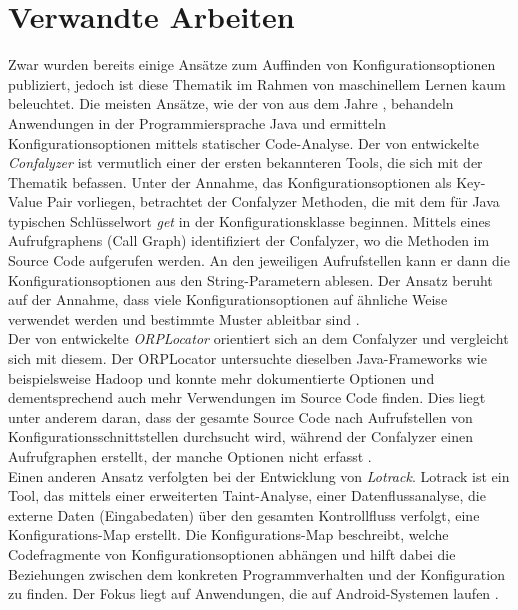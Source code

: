 \documentclass[german,bachelor]{swsLeipzig}
\begin{document}
\chapter{Verwandte Arbeiten}\label{Verwandte Arbeiten}
Zwar wurden bereits einige Ansätze zum Auffinden von Konfigurationsoptionen publiziert, jedoch ist diese Thematik im Rahmen von
maschinellem Lernen kaum beleuchtet.
Die meisten Ansätze, wie der von \citeauthor{10.1145/1985793.1985812} aus dem Jahre \citeyear{10.1145/1985793.1985812},
behandeln Anwendungen in der Programmiersprache Java und ermitteln Konfigurationsoptionen mittels statischer Code-Analyse.
Der von \citeauthor{10.1145/1985793.1985812} entwickelte \textit{Confalyzer} ist vermutlich einer der ersten bekannteren
Tools, die sich mit der Thematik befassen.
Unter der Annahme, das Konfigurationsoptionen als Key-Value Pair vorliegen, betrachtet der Confalyzer Methoden, die mit
dem für Java typischen Schlüsselwort \textit{get} in der Konfigurationsklasse beginnen.
Mittels eines Aufrufgraphens (Call Graph) identifiziert der Confalyzer, wo die Methoden im Source Code aufgerufen werden.
An den jeweiligen Aufrufstellen kann er dann die Konfigurationsoptionen aus den String-Parametern ablesen.
Der Ansatz beruht auf der Annahme, dass viele Konfigurationsoptionen auf ähnliche Weise verwendet werden und bestimmte
Muster ableitbar sind \cite[]{10.1145/1985793.1985812}.\\

Der von \citeauthor{7774519} entwickelte \textit{ORPLocator} orientiert sich an dem Confalyzer und vergleicht sich mit diesem.
Der ORPLocator untersuchte dieselben Java-Frameworks wie beispielsweise Hadoop und konnte mehr dokumentierte
Optionen und dementsprechend auch mehr Verwendungen im Source Code finden.
Dies liegt unter anderem daran, dass der gesamte Source Code nach Aufrufstellen von Konfigurationsschnittstellen durchsucht wird,
während der Confalyzer einen Aufrufgraphen erstellt, der manche Optionen nicht erfasst \cite[]{7774519}.\\

Einen anderen Ansatz verfolgten \citeauthor{8049300} bei der Entwicklung von \textit{Lotrack}.
Lotrack ist ein Tool, das mittels einer erweiterten Taint-Analyse, einer Datenflussanalyse, die externe Daten
(Eingabedaten) über den gesamten Kontrollfluss verfolgt, eine Konfigurations-Map erstellt.
Die Konfigurations-Map beschreibt, welche Codefragmente von Konfigurationsoptionen abhängen und hilft dabei die
Beziehungen zwischen dem konkreten Programmverhalten und der Konfiguration zu finden.
Der Fokus liegt auf Anwendungen, die auf Android-Systemen laufen \cite[]{8049300}. \\
\end{document}
